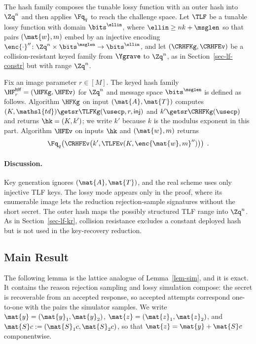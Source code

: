 The hash family composes the tunable lossy function with an outer hash into $\Zq^n$ and then applies $\Fq_q$ to reach the challenge space. Let $\TLF$ be a tunable lossy function with domain $\bits^{\ellin}$, where $\ellin \ge nk + \msglen$ so that pairs $(\mat{w},m)$ embed by an injective encoding $\enc{\cdot}'' \colon \Zq^n \times \bits^{\msglen} \to \bits^{\ellin}$, and let $(\CRHFKg,\CRHFEv)$ be a collision-resistant keyed family from $\Ygrave$ to $\Zq^n$, as in Section~\ref{sec-lf-constr} but with range $\Zq^n$.

\begin{construction} \label{constr-dil-tlf}
Fix an image parameter $r\in[M]$. The keyed hash family $\HF^{\mathsf{ltlf}}_r=(\HFKg,\HFEv)$ for $\Zq^n$ and message space $\bits^{\msglen}$ is defined as follows. Algorithm $\HFKg$ on input $(\mat{A},\mat{T})$ computes $(K,\mathsl{td})\getsr\TLFKg(\usecp,r,\mathsf{inj})$ and $k'\getsr\CRHFKg(\usecp)$ and returns $\hk=(K,k')$; we write $k'$ because $k$ is the modulus exponent in this part. Algorithm $\HFEv$ on inputs $\hk$ and $(\mat{w},m)$ returns
$$
\Fq_q\!\left(\CRHFEv\bigl(k',\TLFEv(K,\enc{\mat{w},m}'')\bigr)\right) \;.
$$
\end{construction}

\paragraph*{Discussion.} Key generation ignores $(\mat{A},\mat{T})$, and the real scheme uses only injective TLF keys. The lossy mode appears only in the proof, where its enumerable image lets the reduction rejection-sample signatures without the short secret. The outer hash maps the possibly structured TLF range into $\Zq^n$. As in Section~\ref{sec-lf-kr}, collision resistance excludes a constant deployed hash but is not used in the key-recovery reduction.

\subsection{Main Result} \label{sec-dil-bk-thm}

The following lemma is the lattice analogue of Lemma~\ref{lem-sim}, and it is exact. It contains the reason rejection sampling and lossy simulation compose: the secret is recoverable from an accepted response, so accepted attempts correspond one-to-one with the pairs the simulator samples. We write $\mat{y} = (\mat{y}_1, \mat{y}_2)$, $\mat{z} = (\mat{z}_1, \mat{z}_2)$, and $\mat{S}c := (\mat{S}_1c, \mat{S}_2c)$, so that $\mat{z} = \mat{y} + \mat{S}c$ componentwise.

